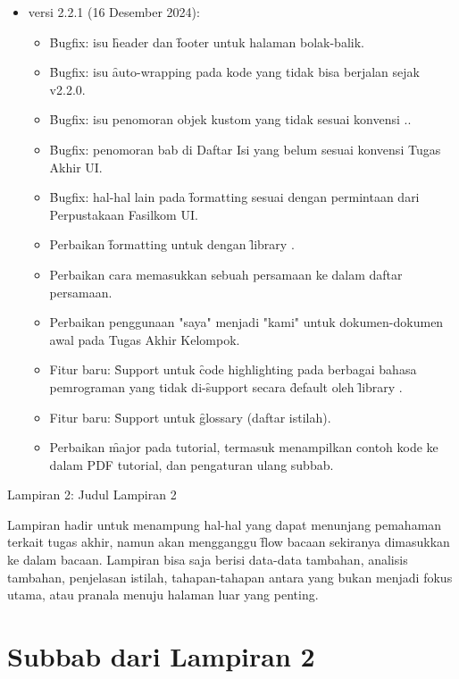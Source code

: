 \begin{itemize}
\begin{itemize}
		\end{itemize}
	\item versi 2.2.1 (16 Desember 2024):
		\begin{itemize}
			\item \f{Bugfix}: isu \f{header} dan \f{footer} untuk halaman bolak-balik.
			\item \f{Bugfix}: isu \f{auto-wrapping} pada kode yang tidak bisa berjalan sejak v2.2.0.
			\item \f{Bugfix}: isu penomoran objek kustom yang tidak sesuai konvensi \code{[bab]}.\code{[objek]}.
			\item \f{Bugfix}: penomoran bab di Daftar Isi yang belum sesuai konvensi Tugas Akhir UI.
			\item \f{Bugfix}: hal-hal lain pada \f{formatting} sesuai dengan permintaan dari Perpustakaan Fasilkom UI.
			\item Perbaikan \f{formatting} untuk  dengan \f{library} .
			\item Perbaikan cara memasukkan sebuah persamaan ke dalam daftar persamaan.
			\item Perbaikan penggunaan "saya" menjadi "kami" untuk dokumen-dokumen awal pada Tugas Akhir Kelompok.
			\item Fitur baru: \f{Support} untuk \f{code highlighting} pada berbagai bahasa pemrograman yang tidak di-\f{support} secara \f{default} oleh \f{library} .
			\item Fitur baru: \f{Support} untuk \f{glossary} (daftar istilah).
			\item Perbaikan \f{major} pada tutorial, termasuk menampilkan contoh kode ke dalam PDF tutorial, dan pengaturan ulang subbab.
		\end{itemize}
\end{itemize}
\clearpage

\begin{flushright}
	Lampiran 2: Judul Lampiran 2
\end{flushright}
\label{appendix:sample}
Lampiran hadir untuk menampung hal-hal yang dapat menunjang pemahaman terkait tugas akhir, namun akan mengganggu \f{flow} bacaan sekiranya dimasukkan ke dalam bacaan.
Lampiran bisa saja berisi data-data tambahan, analisis tambahan, penjelasan istilah, tahapan-tahapan antara yang bukan menjadi fokus utama, atau pranala menuju halaman luar yang penting.

\section*{Subbab dari Lampiran 2}
\label{appendix:sampleSubchap}
